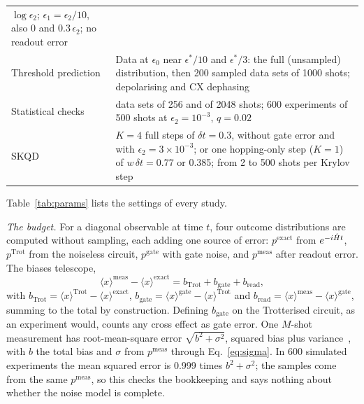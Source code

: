 \begin{table}[tbp]
\begin{tabular}{@{}>{\raggedright\arraybackslash}p{3.3cm}>{\raggedright\arraybackslash}p{12.2cm}@{}}
      $\log\epsilon_2$; $\epsilon_1 = \epsilon_2/10$, also $0$ and
      $0.3\,\epsilon_2$; no readout error \\
    Threshold prediction & Data at $\epsilon_0$ near $\epsilon^\ast/10$ and
      $\epsilon^\ast/3$: the full (unsampled) distribution, then 200 sampled data
      sets of 1000 shots; depolarising and CX dephasing \\
    Statistical checks & 400 data sets of 256 and of 2048 shots; 600 experiments
      of 500 shots at $\epsilon_2 = 10^{-3}$, $q = 0.02$ \\
    SKQD & $K = 4$ full steps of $\delta t = 0.3$, without gate error and with
      $\epsilon_2 = 3\times10^{-3}$; or one hopping-only step ($K = 1$) of
      $w\,\delta t = 0.77$ or 0.385; from 2 to 500 shots per Krylov step \\
    \bottomrule
  \end{tabular}
\end{table}

Table~\ref{tab:params} lists the settings of every study.

\emph{The budget.} For a diagonal observable at time $t$, four outcome
distributions are computed without sampling, each adding one source of error:
$p^{\mathrm{exact}}$ from $e^{-i\hat{H} t}$, $p^{\mathrm{Trot}}$ from the
noiseless circuit, $p^{\mathrm{gate}}$ with gate noise, and $p^{\mathrm{meas}}$
after readout error. The biases telescope,
\begin{equation}
  \label{eq:budget}
  \langle x\rangle^{\mathrm{meas}} - \langle x\rangle^{\mathrm{exact}}
  = b_{\mathrm{Trot}} + b_{\mathrm{gate}} + b_{\mathrm{read}},
\end{equation}
with $b_{\mathrm{Trot}} = \langle x\rangle^{\mathrm{Trot}} - \langle x\rangle^{\mathrm{exact}}$,
$b_{\mathrm{gate}} = \langle x\rangle^{\mathrm{gate}} - \langle x\rangle^{\mathrm{Trot}}$
and $b_{\mathrm{read}} = \langle x\rangle^{\mathrm{meas}} - \langle x\rangle^{\mathrm{gate}}$,
summing to the total by construction. Defining $b_{\mathrm{gate}}$ on the
Trotterised circuit, as an experiment would, counts any cross effect as gate
error. One $M$-shot measurement has root-mean-square error
$\sqrt{b^2 + \sigma^2}$, squared bias plus variance~\cite{cai2023}, with $b$
the total bias and $\sigma$ from $p^{\mathrm{meas}}$ through
Eq.~\eqref{eq:sigma}. In 600 simulated experiments the mean squared error is 0.999 times $b^2 + \sigma^2$;
the samples come from the same $p^{\mathrm{meas}}$, so this checks the
bookkeeping and says nothing about whether the noise model is complete.

